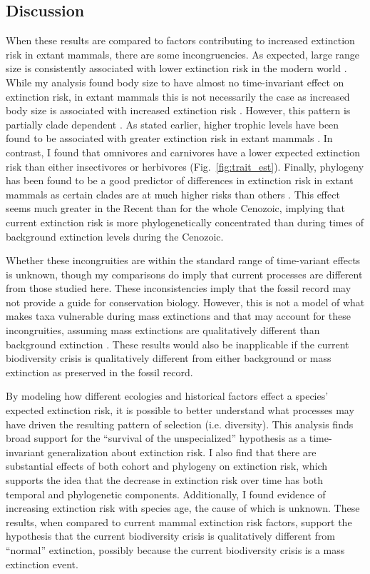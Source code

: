 \documentclass{pnastwo}
\begin{document}
\begin{article}
\section{Discussion}
When these results are compared to factors contributing to increased extinction risk in extant mammals, there are some incongruencies. As expected, large range size is consistently associated with lower extinction risk in the modern world \cite{Liow2009,Purvis2000a,Fritz2009,Fritz2010b}. While my analysis found body size to have almost no time-invariant effect on extinction risk, in extant mammals this is not necessarily the case as increased body size is associated with increased extinction risk \cite{Liow2009,Purvis2000a}. However, this pattern is partially clade dependent \cite{Fritz2009}. As stated earlier, higher trophic levels have been found to be associated with greater extinction risk in extant mammals \cite{Liow2009,Purvis2000a}. In contrast, I found that omnivores and carnivores have a lower expected extinction risk than either insectivores or herbivores (Fig.~\ref{fig:trait_est}). Finally, phylogeny has been found to be a good predictor of differences in extinction risk in extant mammals as certain clades are at much higher risks than others \cite{Fritz2010b}. This effect seems much greater in the Recent than for the whole Cenozoic, implying that current extinction risk is more phylogenetically concentrated than during times of background extinction levels during the Cenozoic.

Whether these incongruities are within the standard range of time-variant effects is unknown, though my comparisons do imply that current processes are different from those studied here. These inconsistencies imply that the fossil record may not provide a guide for conservation biology. However, this is not a model of what makes taxa vulnerable during mass extinctions and that may account for these incongruities, assuming mass extinctions are qualitatively different than background extinction \cite{Jablonski1986}. These results would also be inapplicable if the current biodiversity crisis is qualitatively different from either background or mass extinction as preserved in the fossil record.

By modeling how different ecologies and historical factors effect a species' expected extinction risk, it is possible to better understand what processes may have driven the resulting pattern of selection (i.e. diversity). This analysis finds broad support for the ``survival of the unspecialized'' hypothesis \cite{Simpson1944,Liow2004a} as a time-invariant generalization about extinction risk. I also find that there are substantial effects of both cohort and phylogeny on extinction risk, which supports the idea that the decrease in extinction risk \cite{Raup1982a} over time has both temporal and phylogenetic components. Additionally, I found evidence of increasing extinction risk with species age, the cause of which is unknown. These results, when compared to current mammal extinction risk factors, support the hypothesis that the current biodiversity crisis is qualitatively different from ``normal'' extinction, possibly because the current biodiversity crisis is a mass extinction event.



\end{article}
\end{document}
